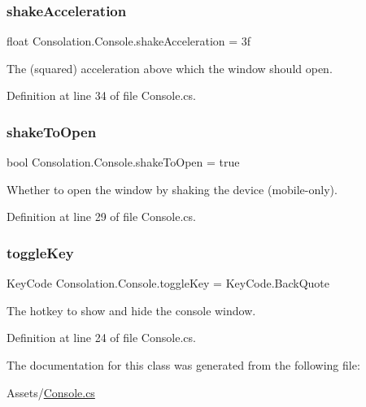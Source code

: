 \mbox{\label{class_consolation_1_1_console_a3eb8d249b0d73bc896515a5965bb2467}} 
\subsubsection{\texorpdfstring{shake\+Acceleration}{shakeAcceleration}}
{\footnotesize\ttfamily float Consolation.\+Console.\+shake\+Acceleration = 3f}



The (squared) acceleration above which the window should open. 



Definition at line 34 of file Console.\+cs.

\mbox{\label{class_consolation_1_1_console_a2234a0d38ecebf01047df1faf2c0bdb0}} 
\subsubsection{\texorpdfstring{shake\+To\+Open}{shakeToOpen}}
{\footnotesize\ttfamily bool Consolation.\+Console.\+shake\+To\+Open = true}



Whether to open the window by shaking the device (mobile-\/only). 



Definition at line 29 of file Console.\+cs.

\mbox{\label{class_consolation_1_1_console_a0abe49a2176e1cdb26e0a8ee01cc9285}} 
\subsubsection{\texorpdfstring{toggle\+Key}{toggleKey}}
{\footnotesize\ttfamily Key\+Code Consolation.\+Console.\+toggle\+Key = Key\+Code.\+Back\+Quote}



The hotkey to show and hide the console window. 



Definition at line 24 of file Console.\+cs.



The documentation for this class was generated from the following file\+:\begin{DoxyCompactItemize}
\item 
Assets/\hyperlink{_console_8cs}{Console.\+cs}\end{DoxyCompactItemize}
